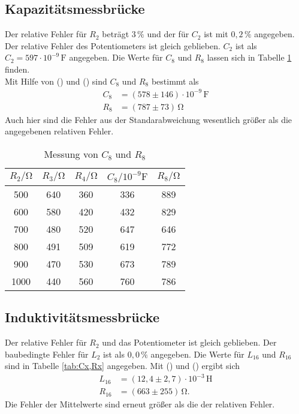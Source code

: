 \subsection{Kapazitätsmessbrücke}
Der relative Fehler für $R_2$ beträgt $3\,\%$ und der für $C_2$ ist mit $0,2 \,\%$ angegeben. Der relative Fehler des Potentiometers ist gleich geblieben.
$C_2$ ist als $C_2 = 597 \cdot 10^{-9}\,\unit{\farad}$ angegeben. Die Werte für $C_8$ und $R_8$ lassen sich in Tabelle \ref{tab:C8,R8} finden.\\
Mit Hilfe von () und () sind $C_8$ und $R_8$ bestimmt als
\begin{align*}
  C_8 &= (578 \pm 146)\cdot 10^{-9} \,\unit{\farad} \\
  R_8 &= (787 \pm 73)\,\unit{\ohm}
\end{align*}
Auch hier sind die Fehler aus der Standarabweichung wesentlich größer als die angegebenen relativen Fehler.

\begin{table}
  \centering
  \caption{Messung von $C_8$ und $R_8$}
  \label{tab:C8,R8}
  \begin{tabular}{c c c c c}
    \toprule
    $R_2/\unit{\ohm}$ & $R_3/\unit{\ohm}$ & $R_4/\unit{\ohm}$ & $C_8/10^{-9}\unit{\farad}$ & $R_8/\unit{\ohm}$ \\
    \midrule
     500 & 640 & 360 & 336 & 889 \\
     600 & 580 & 420 & 432 & 829 \\
     700 & 480 & 520 & 647 & 646 \\
     800 & 491 & 509 & 619 & 772 \\
     900 & 470 & 530 & 673 & 789 \\
    1000 & 440 & 560 & 760 & 786 \\
    \bottomrule
  \end{tabular}
\end{table}

\subsection{Induktivitätsmessbrücke}
Der relative Fehler für $R_2$ und das Potentiometer ist gleich geblieben. Der baubedingte Fehler für $L_2$ ist als $0,0\,\%$ angegeben.
Die Werte für $L_{16}$ und $R_{16}$ sind in Tabelle \ref{tab:Cx,Rx} angegeben. Mit () und () ergibt sich
\begin{align*}
  L_{16} &= (12,4 \pm 2,7)\cdot 10^{-3} \,\unit{\henry} \\
  R_{16} &= (663 \pm 255)\,\unit{\ohm}.
\end{align*}
Die Fehler der Mittelwerte sind erneut größer als die der relativen Fehler.

